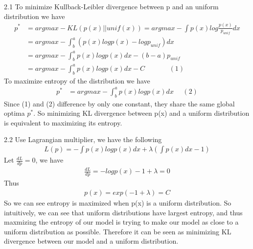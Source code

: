 \documentclass[12pt]{article}
\newenvironment{problem}[2][Problem]{\begin{trivlist}
\item[\hskip \labelsep {\bfseries #1}\hskip \labelsep {\bfseries #2}]}{\end{trivlist}}
\begin{document}
\begin{problem}{Problem 2}
\item{2.1}
To minimize Kullback-Leibler divergence between p and an uniform distribution we have 
\begin{align*}
	p^* &= argmax-KL(p(x)||unif(x)) = argmax-\int p(x) log \frac{p(x)}{p_{unif}} dx \\
	&= argmax-\int_b^a(p(x) logp(x) - logp_{unif}) dx \\
	&= argmax-\int_b^ap(x) logp(x) dx - (b-a)p_{unif} \\
	&= argmax-\int_b^ap(x) logp(x) dx - C  \ \ \ \ \ \ \ \ \ \ \ \ \ \ \ \  (1)
\end{align*}
To maximize entropy of the distribution we have
\begin{align*}
	p^* &= argmax-\int_b^ap(x) logp(x) dx \ \ \ \ \ \ (2)
\end{align*}
Since (1) and (2) difference by only one constant, they share the same global optima $p^*$. So minimizing KL divergence between p(x) and a uniform distribution is equivalent to maximizing its entropy.\\
\item{2.2}
Use Lagrangian multiplier, we have the following
\begin{align*}
	L(p) = -\int p(x)logp(x)dx + \lambda (\int p(x)dx - 1)
\end{align*}
Let $\frac{dL}{dp} = 0$, we have
\begin{align*}
	\frac{dL}{dp} = -logp(x) -1 + \lambda = 0
\end{align*}
Thus 
\begin{align*}
	p(x) = exp(-1+\lambda) = C
\end{align*}
So we can see entropy is maximized when p(x) is a uniform distribution. So intuitively, we can see that uniform distributions have largest entropy, and thus maxmizing the entropy of our model is trying to make our model as close to a uniform distribution as possible. Therefore it can be seen as minimizing KL divergence between our model and a uniform distribution.
\end{problem}
\end{document}
